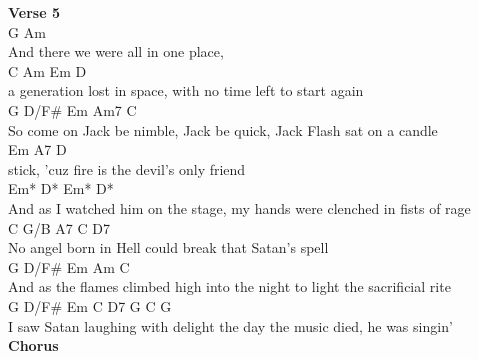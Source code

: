 \documentclass[a4paper]{article}
\begin{document}
{{        }
        \textbf{Verse 5}
        ~\\
        {
            \cutive
            \obeyspaces
     G                Am
\\
And there we were all in one place,
\\
    C        Am            Em                   D
\\
a generation lost in space, with no time left to start again
\\
            G      D/F\#   Em               Am7                 C
\\
So come on Jack be nimble, Jack be quick, Jack Flash sat on a candle 
\\
       Em                   A7             D
\\
stick, 'cuz fire is the devil's only friend
\\
     Em*              D*               Em*                    D*
\\
And as I watched him on the stage, my hands were clenched in fists of rage
\\
   C      G/B    A7         C                  D7
\\
No angel born in Hell could break that Satan's spell
\\
           G            D/F\#      Em             Am              C
\\
And as the flames climbed high into the night to light the sacrificial rite
\\
       G   D/F\#           Em           C      D7      G  C  G
\\
I saw Satan laughing with delight the day the music died,     he was singin'
\\

        }
        \textbf{Chorus}
        ~\\
        {
            \cutive
            \obeyspaces

}}
\end{document}
